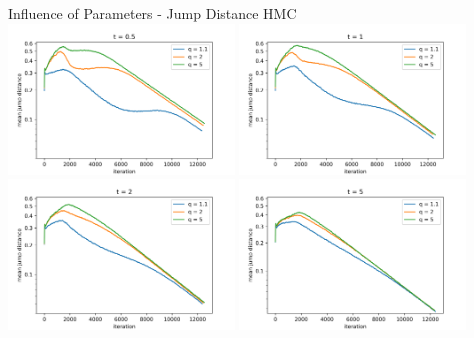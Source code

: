 \documentclass[]{beamer}
\begin{document}
  \begin{frame}{Influence of Parameters - Jump Distance HMC}
    \centering
    \includegraphics[trim={0.35cm, 0.1cm, 1.5cm, 0.5cm}, clip, width=0.45\textwidth]{figs/results/params/jump_distances_hmc_t_05}
    \includegraphics[trim={0.35cm, 0.1cm, 1.5cm, 0.5cm}, clip, width=0.45\textwidth]{figs/results/params/jump_distances_hmc_t_1}
    \includegraphics[trim={0.35cm, 0.1cm, 1.5cm, 0.5cm}, clip, width=0.45\textwidth]{figs/results/params/jump_distances_hmc_t_2}
    \includegraphics[trim={0.35cm, 0.1cm, 1.5cm, 0.5cm}, clip, width=0.45\textwidth]{figs/results/params/jump_distances_hmc_t_5}
  \end{frame}
\end{document}

